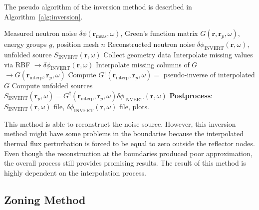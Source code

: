 The pseudo algorithm of the inversion method is described in Algorithm~\ref{alg:inversion}.
\begin{algorithm}[H]
\caption{: Inversion Method}
\label{alg:inversion}
\begin{algorithmic}[1]
\Require Measured neutron noise $\delta \phi(\textbf{r}_{\text{meas}}, \omega)$, Green’s function matrix $G(\textbf{r}, \textbf{r}_p,\omega)$, energy groups $g$, position mesh $n$
\Ensure Reconstructed neutron noise $\delta \phi_{\text{INVERT}}(\textbf{r}, \omega)$, unfolded source $S_{\text{INVERT}}(\textbf{r}, \omega)$
 
    \State Collect geometry data
    \State Interpolate missing values via RBF $\rightarrow \delta \phi_{\text{INVERT}}(\textbf{r}, \omega)$
\EndFor
{} 
    \State Interpolate missing columns of $G$ $\rightarrow G(\textbf{r}_{\text{interp}}, \textbf{r}_p,\omega)$
\EndFor
\State Compute $G^{\dagger}(\textbf{r}_{\text{interp}}, \textbf{r}_p,\omega) =$ pseudo-inverse of interpolated $G$ 
\State Compute unfolded sources $S_{\text{INVERT}}(\textbf{r}_p,\omega) = G^{\dagger}(\textbf{r}_{\text{interp}}, \textbf{r}_p,\omega) \delta \phi_{\text{INVERT}}(\textbf{r}, \omega)$
\State \textbf{Postprocess}: $S_{\text{INVERT}}(\textbf{r},\omega)$ file, $\delta \phi_{\text{INVERT}}(\textbf{r}, \omega)$ file, plots. 
\end{algorithmic}
\end{algorithm}

This method is able to reconstruct the noise source. However, this inversion method might have some problems in the boundaries because the interpolated thermal flux perturbation is forced to be equal to zero outside the reflector nodes. Even though the reconstruction at the boundaries produced poor approximation, the overall process still provides promising results. The result of this method is highly dependent on the interpolation process.

\subsection{Zoning Method}

